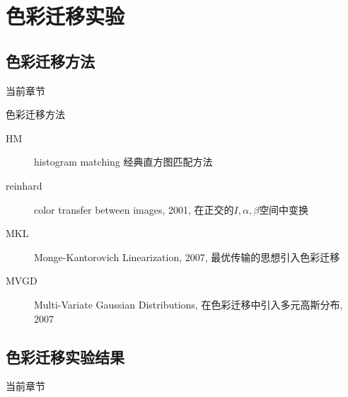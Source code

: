 \section{色彩迁移实验}

\subsection{色彩迁移方法}
\begin{frame}{当前章节}
\end{frame}

\begin{frame}{色彩迁移方法} 
    \begin{description}
        \item[HM] histogram matching 经典直方图匹配方法
        \item[reinhard] color transfer between images, 2001, 在正交的$I, \alpha, \beta$空间中变换
        \item[MKL] Monge-Kantorovich Linearization, 2007, 最优传输的思想引入色彩迁移
        \item[MVGD] Multi-Variate Gaussian Distributions, 在色彩迁移中引入多元高斯分布, 2007
    \end{description}
    
\end{frame}

\subsection{色彩迁移实验结果}

\begin{frame}{当前章节}
\end{frame}


